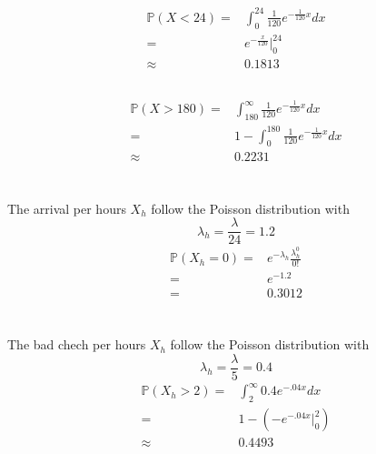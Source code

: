 \documentclass{article}
\begin{document}
    \section{}
        \subsection{}
            \begin{equation*}
                \begin{split}
                    \mathbb{P}(X<24)=&\int_0 ^{24} \frac{1}{120}e^{-\frac{1}{120}x}dx\\
                        =&e^{-\frac{x}{120}}|_0^{24}\\
                        \approx&0.1813
                \end{split}
            \end{equation*}
        \subsection{}
            \begin{equation*}
                \begin{split}
                    \mathbb{P}(X>180)=&\int_{180} ^{\infty} \frac{1}{120}e^{-\frac{1}{120}x}dx\\
                        =&1-\int_{0} ^{180} \frac{1}{120}e^{-\frac{1}{120}x}dx\\
                        \approx&0.2231
                \end{split}
            \end{equation*}
    \section{}
        The arrival per hours $X_h$ follow the Poisson distribution with 
        $$\lambda_h=\frac{\lambda}{24}=1.2$$
        \begin{equation*}
            \begin{split}
                \mathbb{P}(X_h=0)=&e^{-\lambda_h}\frac{\lambda_h^0}{0!}\\
                    =&e^{-1.2}\\
                    =&0.3012
            \end{split}
        \end{equation*}

    \section{}
        The bad chech per hours $X_h$ follow the Poisson distribution with 
        $$\lambda_h=\frac{\lambda}{5}=0.4$$
        \begin{equation*}
            \begin{split}
                \mathbb{P}(X_h>2)=&\int_2^\infty 0.4e^{-.04x}dx\\
                    =&1-(-e^{-.04x}|_0^2)\\
                    \approx&0.4493\\
            \end{split}
        \end{equation*}
\end{document}
